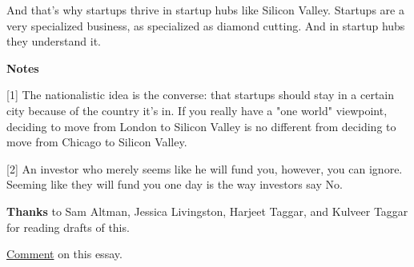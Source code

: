 And
                  that's why startups thrive in startup hubs like Silicon
                  Valley. Startups are a very specialized business, as
                  specialized as diamond cutting. And in startup hubs they
                  understand it.








                  \textbf{Notes}

[1] The nationalistic idea is the converse: that startups
                  should stay in a certain city because of the country it's in.
                  If you really have a "one world" viewpoint, deciding to move
                  from London to Silicon Valley is no different from deciding to
                  move from Chicago to Silicon Valley.

[2] An investor who merely seems like he will fund you,
                  however, you can ignore. Seeming like they will fund you one
                  day is the way investors say No.

\textbf{Thanks} to
                  Sam Altman, Jessica Livingston, Harjeet Taggar, and Kulveer
                  Taggar for reading drafts of this.


                  \href{http://news.ycombinator.com/item?id=65815}{Comment}
                  on this essay.



              
            
          
